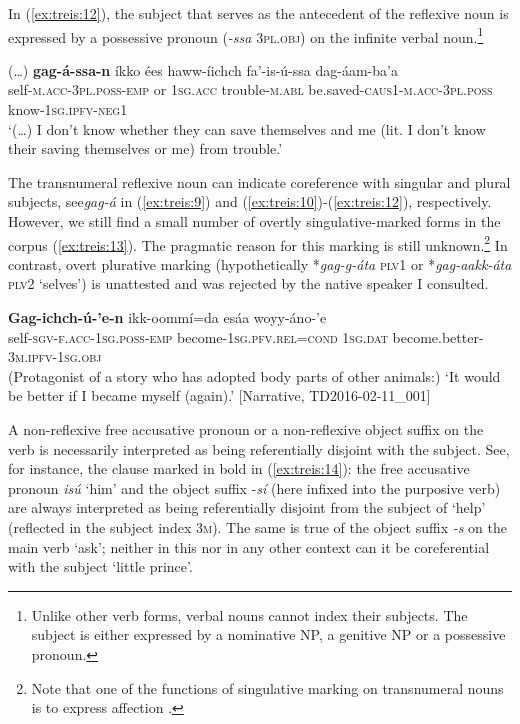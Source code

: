 \documentclass[output=paper]{langscibook}
\begin{document}
In (\ref{ex:treis:12}), the subject that serves as the antecedent of the reflexive noun is expressed by a possessive pronoun (\textit{-ssa} \textsc{3pl.obj}) on the infinite verbal noun.\footnote{Unlike other verb forms, verbal nouns cannot index their subjects. The subject is either expressed by a nominative NP, a genitive NP or a possessive pronoun.}

\ea\label{ex:treis:12} 
\gll (…) \textbf{gag-á-ssa-n} íkko ées haww-íichch fa’-is-ú-ssa dag-áam-ba’a\\
     {} self-\textsc{m.acc-3pl.poss-emp} or \textsc{1sg.acc} trouble-\textsc{m.abl} be.saved-\textsc{caus1-m.acc-3pl.poss} know-\textsc{1sg.ipfv-neg1}\\
\glt ‘(…) I don’t know whether they can save themselves and me (lit. I don’t know their saving themselves or me) from trouble.’ \citep[3.118]{KEB1989}\z

The transnumeral reflexive noun can indicate coreference with singular and plural subjects, see\textit{gag-á} in (\ref{ex:treis:9}) and (\ref{ex:treis:10})-(\ref{ex:treis:12}), respectively. However, we still find a small number of overtly singulative-marked forms in the corpus (\ref{ex:treis:13}). The pragmatic reason for this marking is still unknown.\footnote{Note that one of the functions of singulative marking on transnumeral nouns is to express affection \citep[118f]{Treis2014}.} In contrast, overt plurative marking (hypothetically *\textit{gag-g-áta} \textsc{plv1} or *\textit{gag-aakk-áta} \textsc{plv2} ‘selves’) is unattested and was rejected by the native speaker I consulted. 

\ea\label{ex:treis:13}  
\gll \textbf{Gag-ichch-ú-’e-n} ikk-oommí=da esáa woyy-áno-’e\\
     self-\textsc{sgv-f.acc-1sg.poss-emp} become-\textsc{1sg.pfv.rel=cond} \textsc{1sg.dat} become.better-\textsc{3m.ipfv-1sg.obj}\\
\glt (Protagonist of a story who has adopted body parts of other animals:) ‘It would be better if I became myself (again).’ [Narrative, TD2016-02-11\_001]\z

A non-reflexive free accusative pronoun or a non-reflexive object suffix on the verb is necessarily interpreted as being referentially disjoint with the subject. See, for instance, the clause marked in bold in (\ref{ex:treis:14}): the free accusative pronoun \textit{isú} ‘him’ and the object suffix \nobreakdash-\textit{sí} (here infixed into the purposive verb) are always interpreted as being referentially disjoint from the subject of ‘help’ (reflected in the subject index \textsc{3m}). The same is true of the object suffix \textit{-s} on the main verb ‘ask’; neither in this nor in any other context can it be coreferential with the subject ‘little prince’.
\end{document}

